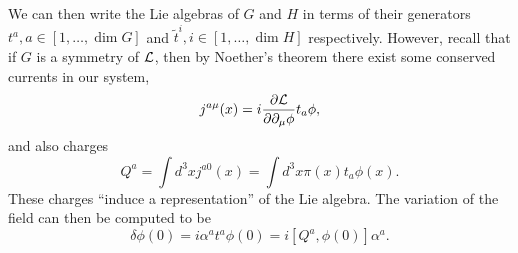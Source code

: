 We can then write the Lie algebras of $G$ and $H$ in terms of their generators $t^a, a\in [1,\ldots, \dim G]$ and $\tilde t^i, i\in[1,\ldots, \dim H]$ respectively. However, recall that if $G$ is a symmetry of $\mathcal L$, then by Noether's theorem there exist some conserved currents in our system,
\begin{equation}
    j^{a\mu}(x)=i\frac{\partial \mathcal L}{\partial \partial_\mu \phi}t_a \phi,
\end{equation}
and also charges
\begin{equation}
    Q^a = \int d^3x j^{a0}(x)=\int d^3x \pi(x) t_a \phi(x).
\end{equation}
These charges ``induce a representation'' of the Lie algebra. The variation of the field can then be computed to be
\begin{equation}
    \delta \phi(0) = i\alpha^a t^a \phi(0) = i[Q^a, \phi(0)] \alpha^a.
\end{equation}